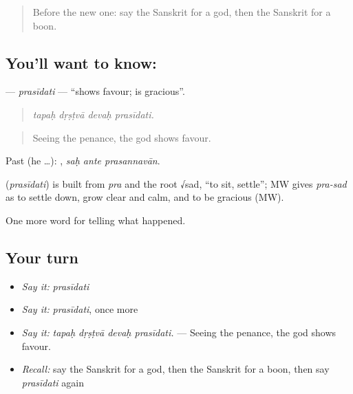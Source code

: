 \label{lesson:SA-C333-prasidati}



\begin{quote}
Before the new one: say the Sanskrit for a god, then the Sanskrit for a boon.
\end{quote}

\subsection*{You'll want to know: }
\textbf{} — \emph{prasīdati} — \textquotedblleft{}shows favour; is gracious\textquotedblright{}.

\begin{quote}
   
\end{quote}

\begin{quote}
\emph{tapaḥ dṛṣṭvā devaḥ prasīdati.}
\end{quote}

\begin{quote}
Seeing the penance, the god shows favour.
\end{quote}

Past (he …):   , \emph{saḥ ante prasannavān}.

\begin{cousinweb}
\textbf{} (\emph{prasīdati}) is built from \emph{pra} and the root √sad, \textquotedblleft{}to sit, settle\textquotedblright{}; MW gives \emph{pra-sad} as to settle down, grow clear and calm, and to be gracious (MW).
\end{cousinweb}

\begin{grammarlens}[title={What you've built}]
One more word for telling what happened.
\end{grammarlens}

\subsection*{Your turn}
\begin{itemize}
\raggedright
  \item \emph{Say it:} \emph{prasīdati}
  \item \emph{Say it:} \emph{prasīdati}, once more
  \item \emph{Say it:} \emph{tapaḥ dṛṣṭvā devaḥ prasīdati.} — Seeing the penance, the god shows favour.
  \item \emph{Recall:} say the Sanskrit for a god, then the Sanskrit for a boon, then say \emph{prasīdati} again
\end{itemize}

